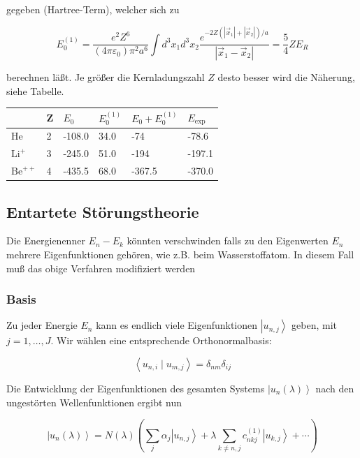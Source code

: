 \documentclass[10pt, letterpaper]{article}
\begin{document}
gegeben (Hartree-Term), welcher sich zu

$$
E_{0}^{(1)}=\frac{e^{2} Z^{6}}{\left(4 \pi \varepsilon_{0}\right) \pi^{2} a^{6}} \int d^{3} x_{1} d^{3} x_{2} \frac{e^{-2 Z\left(\left|\vec{x}_{1}\right|+\left|\vec{x}_{2}\right|\right) / a}}{\left|\vec{x}_{1}-\vec{x}_{2}\right|}=\frac{5}{4} Z E_{R}
$$

berechnen läßt. Je größer die Kernladungszahl $Z$ desto besser wird die Näherung, siehe Tabelle.

\begin{center}
\begin{tabular}{|l|l|l|l|l|l|}
\hline
 & Z & $E_{0}$ & $E_{0}^{(1)}$ & $E_{0}+E_{0}^{(1)}$ & $E_{\text {exp }}$ \\
\hline
He & 2 & -108.0 & 34.0 & -74 & -78.6 \\
$\mathrm{Li}^{+}$ & 3 & -245.0 & 51.0 & -194 & -197.1 \\
$\mathrm{Be}^{++}$ & 4 & -435.5 & 68.0 & -367.5 & -370.0 \\
\hline
\end{tabular}
\end{center}




\subsection*{Entartete Störungstheorie}

Die Energienenner $E_{n}-E_{k}$ könnten verschwinden falls zu den Eigenwerten $E_{n}$ mehrere Eigenfunktionen gehören, wie z.B. beim Wasserstoffatom. In diesem Fall muß das obige Verfahren modifiziert werden

\subsubsection*{Basis}
Zu jeder Energie $E_{n}$ kann es endlich viele Eigenfunktionen $\left|u_{n, j}\right\rangle$ geben, mit $j=1, \ldots, J$. Wir wählen eine entsprechende Orthonormalbasis:

$$
\left\langle u_{n, i} \mid u_{m, j}\right\rangle=\delta_{n m} \delta_{i j}
$$

Die Entwicklung der Eigenfunktionen des gesamten Systems $\left|u_{n}(\lambda)\right\rangle$ nach den ungestörten Wellenfunktionen ergibt nun

$$
\left|u_{n}(\lambda)\right\rangle=N(\lambda)\left(\sum_{j} \alpha_{j}\left|u_{n, j}\right\rangle+\lambda \sum_{k \neq n, j} c_{n k j}^{(1)}\left|u_{k, j}\right\rangle+\cdots\right)
$$
\end{document}
